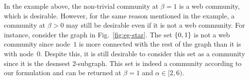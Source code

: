 \begin{example}
	In the example above, the non-trivial community at $\beta =1$ is a web community, which is
desirable. However, for the same reason mentioned in the example, a community at $\beta > 0$ may
still be desirable even if it is not a web community. For instance, consider the graph in
Fig.~\ref{fig:eg-star}. The set $\{0,1\}$ is not a web community since node~$1$ is more
connected with the rest of the graph than it is with node~$0$. Despite this, it is still desirable
to consider this set as a community since it is the desnsest $2$-subgraph. This set is indeed a
community according to our formulation and can be returned at $\beta=1$ and $\alpha\in [2,6)$. 
\end{example}



